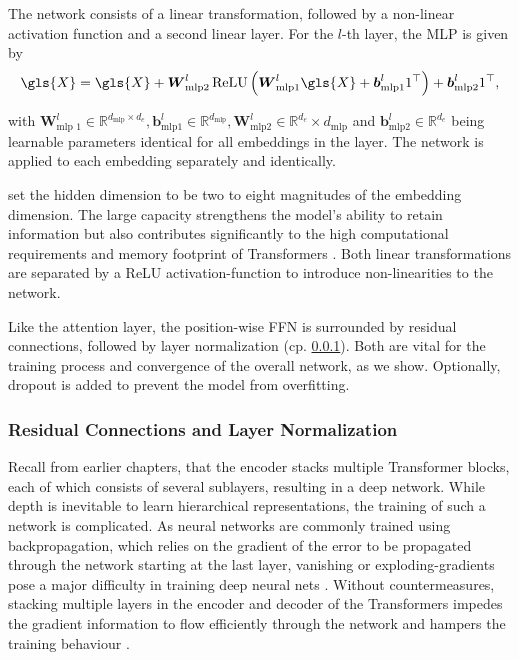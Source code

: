 The network consists of a linear transformation, followed by a non-linear activation function and a second linear layer. For the $l$-th layer, the \gls{MLP} is given by
\begin{equation}
\gls{X} = \gls{X}+\boldsymbol{W}_{\mathrm{mlp} 2}^l \operatorname{ReLU}\left(\boldsymbol{W}_{\mathrm{mlp} 1}^l \gls{X}+\boldsymbol{b}_{\mathrm{mlp} 1}^l 1^{\top}\right)+\boldsymbol{b}_{\mathrm{mlp} 2}^l 1^{\top},
\end{equation}

with $\boldsymbol{W}_{\text {mlp } 1}^l \in \mathbb{R}^{d_{\mathrm{mlp}} \times d_{e}}, \boldsymbol{b}_{\mathrm{mlp} 1}^l \in \mathbb{R}^{d_{\mathrm{mlp}}}, \boldsymbol{W}_{\mathrm{mlp} 2}^l \in \mathbb{R}^{d_{e}} \times d_{\mathrm{mlp}}$ and $\boldsymbol{b}_{\mathrm{mlp} 2}^l \in \mathbb{R}^{d_{e}}$ being learnable parameters identical for all \glspl{embedding} in the layer. The network is applied to each embedding separately and identically.

\textcite[][9]{vaswaniAttentionAllYou2017} set the hidden dimension to be two to eight magnitudes of the embedding dimension. The large capacity strengthens the model's ability to retain information but also contributes significantly to the high computational requirements and memory footprint of Transformers \autocites[][5]{tayEfficientTransformersSurvey2022}[][1]{kitaevReformerEfficientTransformer2020}. Both linear transformations are separated by a \gls{ReLU} \gls{activation-function} \autocite[][318]{glorotDeepSparseRectifier2011} to introduce non-linearities to the network.

Like the attention layer, the position-wise \gls{FFN} is surrounded by residual connections, followed by layer normalization (cp. \cref{sec:residual-connections-layer-norm}). Both are vital for the training process and convergence of the overall network, as we show. Optionally, dropout \autocite[][1930]{srivastavaDropoutSimpleWay} is added to prevent the model from \gls{overfitting}.

\subsubsection{Residual Connections and Layer Normalization}\label{sec:residual-connections-layer-norm}

Recall from earlier chapters, that the encoder stacks multiple Transformer blocks, each of which consists of several sublayers, resulting in a deep network. While depth is inevitable to learn hierarchical representations, the training of such a network is complicated. As neural networks are commonly trained using backpropagation, which relies on the gradient of the error to be propagated through the network starting at the last layer, vanishing or \glspl{exploding-gradient} pose a major difficulty in training deep neural nets \autocite[][1]{heDeepResidualLearning2015}. Without countermeasures, stacking multiple layers in the encoder and decoder of the Transformers impedes the gradient information to flow efficiently through the network and hampers the training behaviour \autocite[][1811]{wangLearningDeepTransformer2019}.

